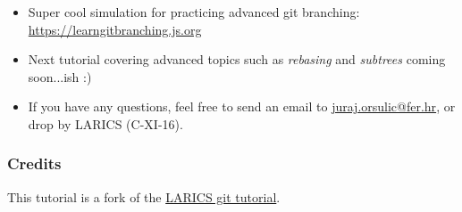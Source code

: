\documentclass[xcolor=dvipsnames]{beamer}%
\begin{document}

\begin{frame}
	\begin{itemize}
     	\item Super cool simulation for practicing advanced git branching: \\ \href{https://learngitbranching.js.org} {https://learngitbranching.js.org}
     	\item Next tutorial covering advanced topics such as \emph{rebasing} and \emph{subtrees} coming soon...ish :)
	\item If you have any questions, feel free to send an email to 
	\href{mailto:juraj.orsulic@fer.hr}{juraj.orsulic@fer.hr}, or drop by LARICS (C-XI-16).
	\end{itemize}
\end{frame}


\begin{frame}

\frametitle{Credits}

This tutorial is a fork of the \href{https://github.com/larics/git-tutorial-intro}{LARICS git tutorial}.

\end{frame}

\end{document}
